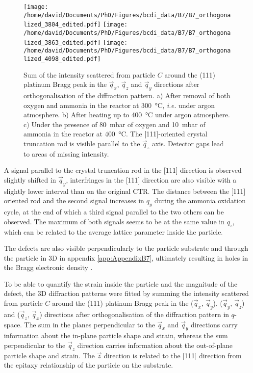 \begin{figure}[!htb]
    \centering
    \texttt{[image: /home/david/Documents/PhD/Figures/bcdi\_data/B7/B7\_orthogonalized\_3804\_edited.pdf]}
    \texttt{[image: /home/david/Documents/PhD/Figures/bcdi\_data/B7/B7\_orthogonalized\_3863\_edited.pdf]}
    \texttt{[image: /home/david/Documents/PhD/Figures/bcdi\_data/B7/B7\_orthogonalized\_4098\_edited.pdf]}
    \caption{
        Sum of the intensity scattered from particle $C$ around the (111) platinum Bragg peak in the $\vec{q}_x$, $\vec{q}_z$ and $\vec{q}_y$ directions after orthogonalisation of the diffraction pattern.
        a) After removal of both oxygen and ammonia in the reactor at \qty{300}{\degreeCelsius}, \textit{i.e.} under argon atmosphere.
        b) After heating up to \qty{400}{\degreeCelsius} under argon atmosphere.
        c) Under the presence of \qty{80}{\milli\bar} of oxygen and \qty{10}{\milli\bar} of ammonia in the reactor at \qty{400}{\degreeCelsius}.
        The [111]-oriented crystal truncation rod is visible parallel to the $\vec{q}_z$ axis.
        Detector gaps lead to areas of missing intensity.
    }
    \label{fig:B7Ortho}
\end{figure}

A signal parallel to the crystal truncation rod in the [111] direction is observed slightly shifted in $\vec{q}_y$, interfringes in the [111] direction are also visible with a slightly lower interval than on the original CTR.
The distance between the [111] oriented rod and the second signal increases in $q_y$ during the ammonia oxidation cycle, at the end of which a third signal parallel to the two others can be observed.
The maximum of both signals seems to be at the same value in $q_z$, which can be related to the average lattice parameter inside the particle.

The defects are also visible perpendicularly to the particle substrate and through the particle in 3D in appendix \ref{app:AppendixB7}, ultimately resulting in holes in the Bragg electronic density \parencite{Clark2015, Dupraz2015}.

To be able to quantify the strain inside the particle and the magnitude of the defect, the 3D diffraction patterns were fitted by summing the intensity scattered from particle $C$ around the (111) platinum Bragg peak in the ($\vec{q}_x$, $\vec{q}_y$), ($\vec{q}_y$, $\vec{q}_z$) and ($\vec{q}_z$, $\vec{q}_x$) directions after orthogonalisation of the diffraction pattern in $q$-space.
The sum in the planes perpendicular to the $\vec{q}_x$ and $\vec{q}_y$ directions carry information about the in-plane particle shape and strain, whereas the sum perpendicular to the $\vec{q}_z$ direction carries information about the out-of-plane particle shape and strain.
The $\vec{z}$ direction is related to the [111] direction from the epitaxy relationship of the particle on the substrate.

